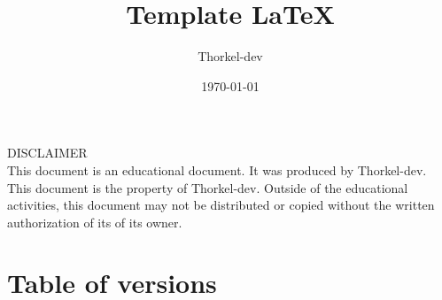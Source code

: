 \documentclass[a4paper,11pt,titlepage]{article}
\author{Thorkel-dev}        %
\title{Template \LaTeX}     %
\date{\normalsize\today}    %
\begin{document}
\maketitle

\BgThispage %
\vspace*{\fill}
\noindent
DISCLAIMER \\
This document is an educational document. It was produced by Thorkel-dev.
This document is the property of Thorkel-dev. Outside of the educational activities, this document
may not be distributed or copied without the written authorization of its
of its owner.
\vspace*{\fill}
\clearpage

\section*{Table of versions}
 \label{TableOfVersion} %
\clearpage

\tableofcontents %







\printglossary[type=\acronymtype] \label{acronyms}
\glsaddallunused %

\printglossary[] \label{domaindictionary} %
\glsaddallunused %

\listoffigures \label{TableOfFigure} %

\listoflistings \label{TableOfCode} %

\printbibliography[heading=bibnumbered, label=bibliography] %
\nocite{*} %

\clearpage
\null
\thispagestyle{empty}%
\addtocounter{page}{-1}%
\BgThispage
\end{document}
